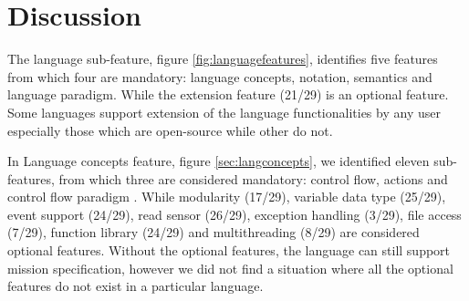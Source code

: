 \section{Discussion}


The language sub-feature, figure  \ref{fig:languagefeatures}, identifies five features from which four are mandatory: language concepts, notation, semantics and language paradigm. While the extension feature (21/29) is an optional feature. Some languages support extension of the language functionalities by any user especially those which are open-source  while other do not.

 
In Language concepts feature, figure \ref{sec:langconcepts}, we identified eleven sub-features, from which three are considered mandatory: control flow, actions and control flow paradigm . While modularity (17/29), variable data type (25/29), event support (24/29), read sensor (26/29), exception handling (3/29), file access (7/29), function library (24/29) and multithreading (8/29) are considered optional features. Without the optional features, the language can still support mission specification, however we did not find a situation where all the optional features do not exist in a particular language.


